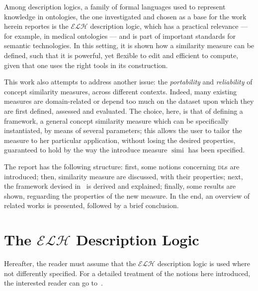\documentclass[]{llncs}
\DeclareMathOperator{\simi}{simi}
\theoremstyle{remark}
\newcommand{\elh}{\(\mathcal{ELH}{}\)}
\newcommand{\dl}{\textsc{dl}}
\begin{document}
  Among description logics, a family of formal languages used to represent knowledge in ontologies, the one investigated and chosen as a base for the work herein reportes is the \elh{} description logic, which has a practical relevance --- for example, in medical ontologies --- and is part of important standards for semantic technologies.
  In this setting, it is shown how a similarity measure can be defined, such that it is powerful, yet flexible to edit and efficient to compute, given that one uses the right tools in its construction.

  This work also attempts to address another issue: the \emph{portability} and \emph{reliability} of concept similarity measures, across different contexts.
  Indeed, many existing measures are domain-related or depend too much on the dataset upon which they are first defined, assessed and evaluated.
  The choice, here, is that of defining a framework, a general concept similarity measure which can be specifically instantiated, by means of several parameters; this allows the user to tailor the measure to her particular application, without losing the desired properties, guaranteed to hold by the way the introduce measure \(\simi\) has been specified.

  The report has the following structure:
  first, some notions concerning \dl{}s are introduced;
  then, similarity measure are discussed, with their properties;
  next, the framework devised in~\cite{LeTu12} is derived and explained;
  finally, some results are shown, reguarding the properties of the new measure.
  In the end, an overview of related works is presented, followed by a brief conclusion.

  \section{The \(\mathcal{ELH}\) Description Logic}
  Hereafter, the reader must assume that the \elh{} description logic is used where not differently specified.
  For a detailed treatment of the notions here introduced, the interested reader can go to~\cite{DLbook}.
\end{document}
